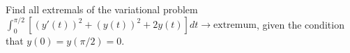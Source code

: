 Find all extremals of the variational problem
$\int_0^{\pi/2}[(y'(t))^2+(y(t))^2+2 y(t)] dt \rightarrow
\text{extremum}$, given the condition that $y(0)=y(\pi/2)=0$.
